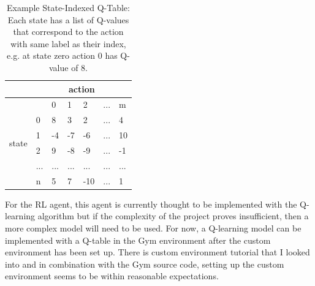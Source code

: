 \documentclass[10pt,twocolumn]{article}
\begin{document}
\begin{table}[]
\caption{Example State-Indexed Q-Table: Each state has a list of Q-values that correspond to the action with same label as their index, e.g. at state zero action 0 has Q-value of 8.}
\vspace{0.2cm}
\center
\begin{tabular}{l|llllll|}
\cline{2-7}
                                             & \multicolumn{6}{c|}{action}                                                                                                                \\ \hline
\multicolumn{1}{|l|}{\multirow{6}{*}{state}} & \multicolumn{1}{l|}{}    & \multicolumn{1}{l|}{0}   & \multicolumn{1}{l|}{1}   & \multicolumn{1}{l|}{2}   & \multicolumn{1}{l|}{...} & m   \\ \cline{2-7} 
\multicolumn{1}{|l|}{}                       & \multicolumn{1}{l|}{0}   & \multicolumn{1}{l|}{8}   & \multicolumn{1}{l|}{3}   & \multicolumn{1}{l|}{2}   & \multicolumn{1}{l|}{...} & 4   \\ \cline{2-7} 
\multicolumn{1}{|l|}{}                       & \multicolumn{1}{l|}{1}   & \multicolumn{1}{l|}{-4}  & \multicolumn{1}{l|}{-7}  & \multicolumn{1}{l|}{-6}  & \multicolumn{1}{l|}{...} & 10  \\ \cline{2-7} 
\multicolumn{1}{|l|}{}                       & \multicolumn{1}{l|}{2}   & \multicolumn{1}{l|}{9}   & \multicolumn{1}{l|}{-8}  & \multicolumn{1}{l|}{-9}  & \multicolumn{1}{l|}{...} & -1  \\ \cline{2-7} 
\multicolumn{1}{|l|}{}                       & \multicolumn{1}{l|}{...} & \multicolumn{1}{l|}{...} & \multicolumn{1}{l|}{...} & \multicolumn{1}{l|}{...} & \multicolumn{1}{l|}{...} & ... \\ \cline{2-7} 
\multicolumn{1}{|l|}{}                       & \multicolumn{1}{l|}{n}   & \multicolumn{1}{l|}{5}   & \multicolumn{1}{l|}{7}   & \multicolumn{1}{l|}{-10} & \multicolumn{1}{l|}{...} & 1   \\ \hline
\end{tabular}
\end{table}

For the RL agent, this agent is currently thought to be implemented with the Q-learning algorithm but if the complexity of the project proves insufficient, then a more complex model will need to be used.
For now, a Q-learning model can be implemented with a Q-table in the Gym environment after the custom environment has been set up.
There is custom environment tutorial that I looked into \cite{Kathuria2021} and in combination with the Gym source code, setting up the custom environment seems to be within reasonable expectations.
\end{document}
